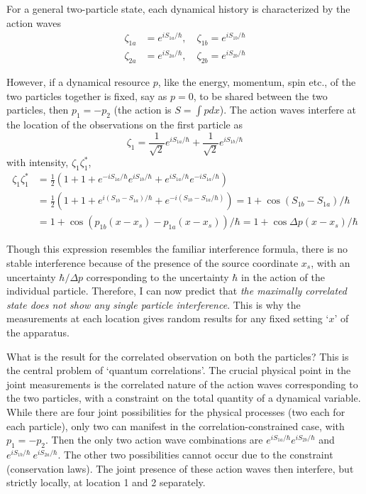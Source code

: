 For a general two-particle state, each dynamical history is characterized by the action waves
\begin{align*}
\zeta_{1a} & = e^{iS_{1a}/\hbar}, \quad \zeta_{1b}  = e^{iS_{1b}/\hbar} \tag{34}\label{c14-eq34}\\
\zeta_{2a} & = e^{iS_{2a} /\hbar}, \quad \zeta_{2b} = e^{iS_{2b}/\hbar} \tag{35}\label{c14-eq35}
\end{align*}

However, if a dynamical resource $p$, like the energy, momentum, spin etc., of the two particles
together is fixed, say as $p = 0$, to be shared between the two particles, then $p_1 = - p_2$ (the
action is $S = \int pdx$). The action waves interfere at the location of the observations on the
first particle as
\begin{equation*}
\zeta_1 = \frac{1}{\sqrt{2}} e^{iS_{1a}/ \hbar}  + \frac{1}{\sqrt{2}} e^{iS_{1b} /\hbar} \tag{36}\label{c14-eq36}
\end{equation*}
with intensity, $\zeta_1 \zeta_1^{\ast}$,
{\fontsize{9}{9}\selectfont\begin{align*}
\zeta_1 \zeta^{\ast}_1 & = \frac{1}{2} \left(1+1+e^{-iS_{1a}/ \hbar} e^{iS_{1b} / \hbar} + e^{iS_{1a} / \hbar} e^{-iS_{1a}/\hbar} \right)\\
& = \frac{1}{2} \left( 1+1+e^{i(S_{1b} - S_{1a})/\hbar} + e^{-i(S_{1b} - S_{1a}/\hbar)} \right) = 1 + \cos (S_{1b} - S_{1a})/\hbar \tag{37}\label{c14-eq37}\\
& = 1 + \cos (p_{1b} (x-x_s) - p_{1a} (x-x_s)) / \hbar = 1 + \cos \Delta p (x-x_s) /\hbar \tag{38}\label{c14-eq38}
\end{align*}}

Though this expression resembles the familiar interference formula, there is no stable interference because of the presence of the source coordinate $x_s$, with an uncertainty $\hbar/ \Delta p$ corresponding to the uncertainty $\hbar$ in the action of the individual particle. Therefore, I can
now predict that \textit{the maximally correlated state does not show any single particle interference}. This is why the measurements at each location gives random results for any fixed setting `$x$' of the apparatus.

What is the result for the correlated observation on both the particles? This is the
central problem of `quantum correlations'. The crucial physical point in the joint measurements is the correlated nature of the action waves corresponding to the two particles, with a constraint on the total quantity of a dynamical variable. While there are four joint possibilities for the physical processes (two each for each particle), only two can manifest in the correlation-constrained case, with $p_1 = -p_2$. Then the only two action wave combinations
are $e^{iS_{1a} /\hbar}  e^{iS_{2b} /\hbar}$ and $e^{iS_{1b}/ \hbar} ~e^{iS_{2a}/\hbar}$. The other two possibilities cannot occur due to the
constraint (conservation laws). The joint presence of these action waves then interfere, but strictly locally, at location 1 and 2 separately.

